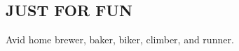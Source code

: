 \documentclass{res}
\begin{document}
\begin{resume}
\section{JUST FOR FUN}          
    Avid home brewer, baker, biker, climber, and runner.

\end{resume}
\end{document}
